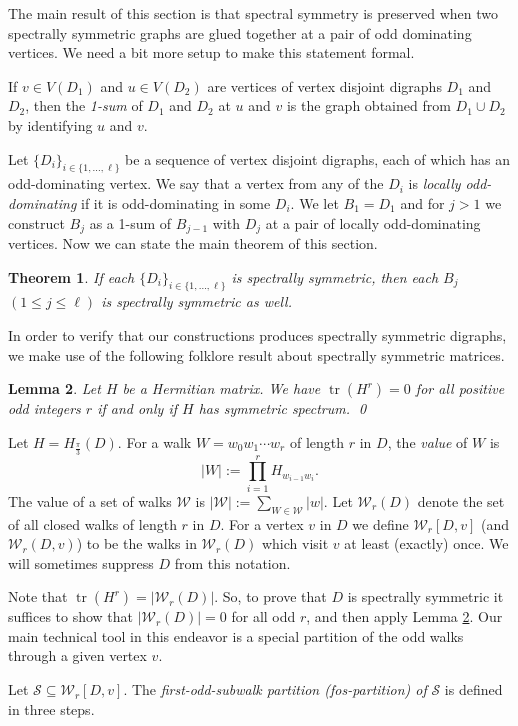 \documentclass[11pt]{article}
\theoremstyle{plain}
\newtheorem{theorem}{Theorem}[section]
\newtheorem{lemma}[theorem]{Lemma}
\DeclareMathOperator{\tr}{tr}
\newcommand{\ssym}[0]{spectrally symmetric }
\newcommand{\Hs}[0]{H_{\frac{\pi}{3}}}
\newcommand{\ssymend}[0]{spectrally symmetric}
\newcommand{\W}[0]{\mathcal{W}}
\renewcommand{\S}[0]{\mathcal{S}}
\begin{document}
The main result of this section is that spectral symmetry is preserved when two spectrally symmetric graphs are glued together at a pair of odd dominating vertices. We need a bit more setup to make this statement formal. 

If $v\in V(D_1)$ and $u\in V(D_2)$ are vertices of vertex disjoint digraphs $D_1$ and $D_2$, then the \emph{1-sum} of $D_1$ and $D_2$ at $u$ and $v$ is the graph obtained from $D_1\cup D_2$ by identifying $u$ and $v$. 

Let $\{D_i\}_{i\in \{1,\dots,\ell\}}$ be a sequence of vertex disjoint digraphs, each of which has an odd-dominating vertex. We say that a vertex from any of the $D_i$ is \emph{locally odd-dominating} if it is odd-dominating in some $D_i$. We let $B_1=D_1$ and for $j>1$ we construct $B_j$ as a 1-sum of $B_{j-1}$ with $D_j$ at a pair of locally odd-dominating vertices. Now we can state the main theorem of this section.

\begin{theorem} \label{Thm:Gluing_Construction_1}
If each  $\{D_i\}_{i\in \{1,\dots,\ell\}}$ is \ssymend, then each $B_j$ $(1\leq j\leq \ell)$ is \ssym as well. 
\end{theorem}



In order to verify that our constructions produces \ssym digraphs, we make use of the following folklore result about spectrally symmetric matrices.
\begin{lemma} \label{Lem:Sym_spec_Char}
    Let $H$ be a Hermitian matrix. We have $\tr(H^r)=0$ for all positive odd integers $r$ if and only if $H$ has symmetric spectrum. \qed
\end{lemma}

Let $H=\Hs(D)$. For a walk $W=w_0w_1\cdots w_r$ of length $r$ in $D$, the \emph{value} of $W$ is \[|W|:=\prod_{i=1}^rH_{w_{i-1}w_i}.\] The value of a set of walks $\W$ is $|\W|:=\sum_{W\in \W}|w|.$ Let $\W_r(D)$ denote the set of all closed walks of length $r$ in $D$. For a vertex $v$ in $D$ we define $\W_r[D,v]$ (and $\W_r(D,v)$) to be the walks in $\W_r(D)$ which visit $v$ at least (exactly) once. We will sometimes suppress $D$ from this notation. 


Note that $\tr(H^r)=|\W_r(D)|$. So, to prove that $D$ is \ssym it suffices to show that $|\W_r(D)|=0$ for all odd $r$, and then apply Lemma \ref{Lem:Sym_spec_Char}. Our main technical tool in this endeavor is a special partition of the odd walks through a given vertex $v$.

Let $\S\subseteq \W_r[D,v]$. The \emph{first-odd-subwalk partition (fos-partition) of} $\S$ is defined in three steps. 
\end{document}
